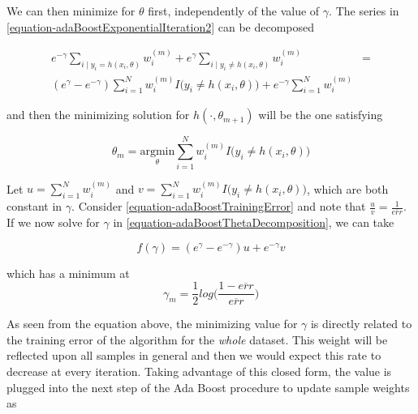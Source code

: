 We can then minimize for $\theta$ first, independently of the value of $\gamma$. The series in \ref{equation-adaBoostExponentialIteration2} can be decomposed

\begin{equation} \label{equation-adaBoostThetaDecomposition}
\begin{split}
e^{-\gamma} \sum_{i \mid y_i = h(x_i,\theta)} w_i^{(m)}  + e^{\gamma} \sum_{i \mid y_i \neq h(x_i,\theta)} w_i^{(m)} & = \\
( e^{\gamma} - e^{-\gamma}) \sum_{i = 1}^{N} w_i^{(m)} I \big( y_i \neq h(x_i,\theta)   \big)  + e^{-\gamma} \sum_{i = 1}^{N}   w_i^{(m)} &
\end{split}
\end{equation}


and then the minimizing solution for $h(\cdot, \theta_{m+1})$ will be the one satisfying

\begin{equation} \label{equation-adaBoostThetaMinimization}
\theta_{m} = \underset{ \theta}{\mathrm{argmin}}  \sum_{i=1}^{N}  w_i^{(m)} I \big( y_i \neq h(x_i,\theta)   \big)
\end{equation}

Let $u = \sum_{i=1}^{N}  w_i^{(m)}$ and $v = \sum_{i=1}^{N}  w_i^{(m)} I \big( y_i \neq h(x_i,\theta)   \big) $, which are both constant in $\gamma$. Consider \ref{equation-adaBoostTrainingError} and note that $\frac{u}{v} = \frac{1}{\overline{err}}$. If we now solve for $\gamma$ in \ref{equation-adaBoostThetaDecomposition}, we can take

\begin{equation} \label{equation-adaBoostBetaMinimization}
f(\gamma) = ( e^{\gamma} - e^{-\gamma}) u +  e^{-\gamma}v
\end{equation}

which has a minimum at
\begin{equation}
\gamma_{m} = \frac{1}{2} log\big( \frac{1 - \overline{err} }{ \overline{err} }  \big)
\end{equation}

As seen from the equation above, the minimizing value for $\gamma$ is directly related to the training error of the algorithm for the \textit{whole} dataset. This weight will be reflected upon all samples in general and then we would expect this rate to decrease at every iteration.  Taking advantage of this closed form, the value is plugged into the next step of the Ada Boost procedure to update sample weights as

